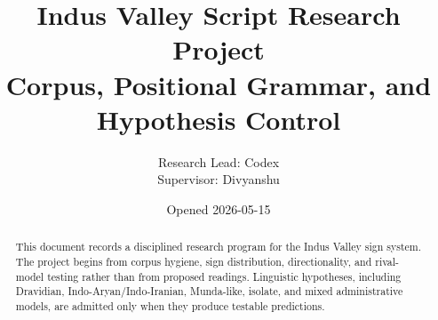 \documentclass[11pt,a4paper]{article}
\title{Indus Valley Script Research Project\\
\large Corpus, Positional Grammar, and Hypothesis Control}
\author{Research Lead: Codex\\Supervisor: Divyanshu}
\date{Opened 2026-05-15}
\begin{document}
\maketitle

\begin{abstract}
This document records a disciplined research program for the Indus Valley sign system. The project begins from corpus hygiene, sign distribution, directionality, and rival-model testing rather than from proposed readings. Linguistic hypotheses, including Dravidian, Indo-Aryan/Indo-Iranian, Munda-like, isolate, and mixed administrative models, are admitted only when they produce testable predictions.
\end{abstract}

\tableofcontents
\newpage



































\end{document}
